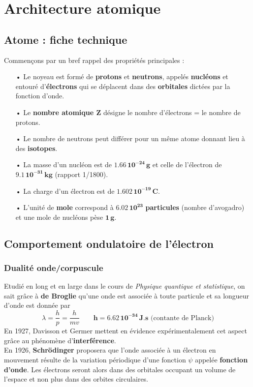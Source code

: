 
\chapter{Architecture atomique}
\section{Atome : fiche technique}
\noindent Commençons par un bref rappel des propriétés principales : \\
\begin{itemize}
	\item[•] Le noyeau est formé de \textbf{protons} et \textbf{neutrons}, appelés \textbf{nucléons} et entouré d'\textbf{électrons} qui se déplacent dans des \textbf{orbitales} dictées par la fonction d'onde.
	\item[•] Le \textbf{nombre atomique Z} désigne le nombre d'électrons = le nombre de protons.
	\item[•] Le nombre de neutrons peut différer pour un même atome donnant lieu à des \textbf{isotopes}.
	\item[•] La masse d'un nucléon est de $\mathbf{1.66 \, 10^{-24} \,g}$ et celle de l'électron de $\mathbf{9.1 \, 10^{-31} \,kg}$ (rapport 1/1800).
	\item[•] La charge d'un électron est de $\mathbf{1.602 \, 10^{-19} \, C}$.
	\item[•] L'unité de \textbf{mole} correspond à $\mathbf{6.02 \, 10^{23}}$ \textbf{particules} (nombre d'avogadro) et une mole de nucléons pèse $\mathbf{1\, g}$.
\end{itemize}
	
\section{Comportement ondulatoire de l'électron}

\subsection{Dualité onde/corpuscule}
\noindent Etudié en long et en large dans le cours de \emph{Physique quantique et statistique}, on sait grâce à \textbf{de Broglie} qu'une onde est associée à toute particule et sa longueur d'onde est donnée par
\begin{equation}
	\lambda = \frac{h}{p} = \frac{h}{mv} \qquad \mathbf{h = 6.62 \, 10^{-34} \, J.s} \mbox{ (contante de Planck)}
\end{equation}
\noindent En 1927, Davisson et Germer mettent en évidence expérimentalement cet aspect grâce au phénomène d'\textbf{interférence}. \\
En 1926, \textbf{Schrödinger} proposera que l'onde associée à un électron en mouvement résulte de la variation périodique d'une fonction $\psi$ appelée \textbf{fonction d'onde}. Les électrons seront alors dans des orbitales occupant un volume de l'espace et non plus dans des orbites circulaires.  
	
